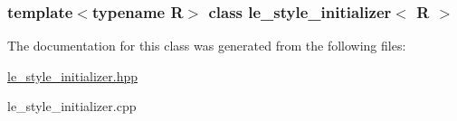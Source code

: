 \subsubsection*{template$<$typename R$>$ class le\_\-style\_\-initializer$<$ R $>$}



The documentation for this class was generated from the following files:\begin{DoxyCompactItemize}
\item 
\hyperlink{le__style__initializer_8hpp}{le\_\-style\_\-initializer.hpp}\item 
le\_\-style\_\-initializer.cpp\end{DoxyCompactItemize}
